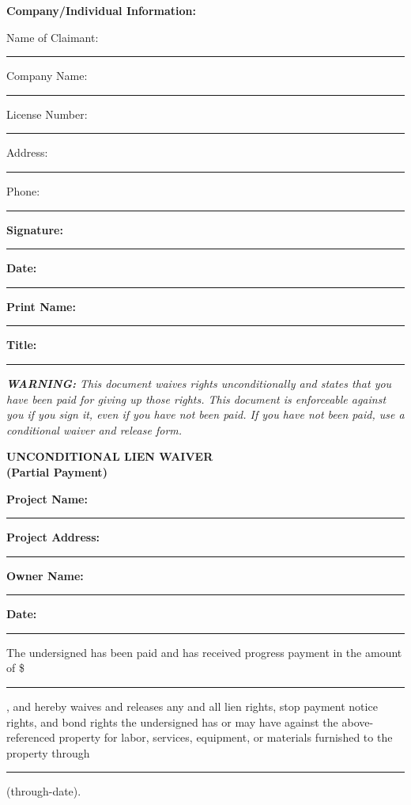 \documentclass[11pt,letterpaper]{article}
\begin{document}
\vspace{12pt}

\textbf{Company/Individual Information:}

Name of Claimant: \rule{8cm}{0.4pt}

Company Name: \rule{8cm}{0.4pt}

License Number: \rule{5cm}{0.4pt}

Address: \rule{10cm}{0.4pt}

Phone: \rule{4cm}{0.4pt}

\vspace{12pt}

\textbf{Signature:} \rule{6cm}{0.4pt} \textbf{Date:} \rule{3cm}{0.4pt}

\textbf{Print Name:} \rule{6cm}{0.4pt}

\textbf{Title:} \rule{6cm}{0.4pt}

\vspace{6pt}

\textit{\textbf{WARNING:} This document waives rights unconditionally and states that you have been paid for giving up those rights. This document is enforceable against you if you sign it, even if you have not been paid. If you have not been paid, use a conditional waiver and release form.}

\newpage

\begin{center}
\textbf{\Large UNCONDITIONAL LIEN WAIVER}\\
\textbf{\Large (Partial Payment)}
\end{center}

\vspace{12pt}

\textbf{Project Name:} \rule{9cm}{0.4pt}

\textbf{Project Address:} \rule{9cm}{0.4pt}

\textbf{Owner Name:} \rule{9cm}{0.4pt}

\textbf{Date:} \rule{4cm}{0.4pt}

\vspace{6pt}

The undersigned has been paid and has received progress payment in the amount of \$ \rule{4cm}{0.4pt}, and hereby waives and releases any and all lien rights, stop payment notice rights, and bond rights the undersigned has or may have against the above-referenced property for labor, services, equipment, or materials furnished to the property through \rule{4cm}{0.4pt} (through-date).

\vspace{6pt}
\end{document}
